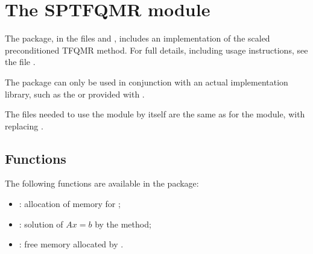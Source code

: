 
\section{The SPTFQMR module}\label{ss:sptfqmr}

The {\sptfqmr} package, in the files  and , includes an
implementation of the scaled preconditioned TFQMR method.  
For full details, including usage instructions, see the file .

{\warn}The {\sptfqmr} package can only be used in conjunction with an actual {\nvector} 
implementation library, such as the {\nvecs} or {\nvecp} provided with {\sundials}.

The files needed to use the {\sptfqmr} module by itself are the same as for the
{\spgmr} module, with  replacing .

\subsection{Functions}
The following functions are available in the {\sptfqmr} package:  
\begin{itemize}
\item {}: allocation of memory for ;
\item {}: solution of $Ax = b$ by the {\sptfqmr} method;
\item {}: free memory allocated by .
\end{itemize}

